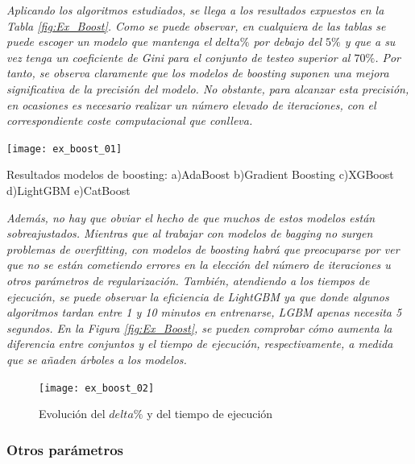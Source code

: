 \documentclass[12pt,twoside]{article}
\begin{document}
\emph{Aplicando los algoritmos estudiados, se llega a los resultados expuestos en la Tabla \ref{fig:Ex_Boost}. Como se puede observar, en cualquiera de las tablas se puede escoger un modelo que mantenga el $delta\%$ por debajo del $5\%$ y que a su vez tenga un coeficiente de Gini para el conjunto de testeo superior al $70\%$. Por tanto, se observa claramente que los modelos de boosting suponen una mejora significativa de la precisión del modelo. No obstante, para alcanzar esta precisión, en ocasiones es necesario realizar un número elevado de iteraciones, con el correspondiente coste computacional que conlleva.}

\begin{table}[h]
\centering
\texttt{[image: ex\_boost\_01]}
\caption{Resultados modelos de boosting: a)AdaBoost b)Gradient Boosting c)XGBoost d)LightGBM e)CatBoost}
\label{fig:Ex_Boost}
\end{table}

\emph{Además, no hay que obviar el hecho de que muchos de estos modelos están sobreajustados. Mientras que al trabajar con modelos de bagging no surgen problemas de overfitting, con modelos de boosting habrá que preocuparse por ver que no se están cometiendo errores en la elección del número de iteraciones u otros parámetros de regularización. También, atendiendo a los tiempos de ejecución, se puede observar la eficiencia de LightGBM ya que donde algunos algoritmos tardan entre 1 y 10 minutos en entrenarse, LGBM apenas necesita 5 segundos. En la Figura \ref{fig:Ex_Boost}, se pueden comprobar cómo aumenta la diferencia entre conjuntos y el tiempo de ejecución, respectivamente, a medida que se añaden árboles a los modelos.}

\begin{figure}[h]
\centering
\texttt{[image: ex\_boost\_02]}
\caption{Evolución del $delta\%$ y del tiempo de ejecución}
\end{figure}





\subsubsection{Otros parámetros}
\end{document}

